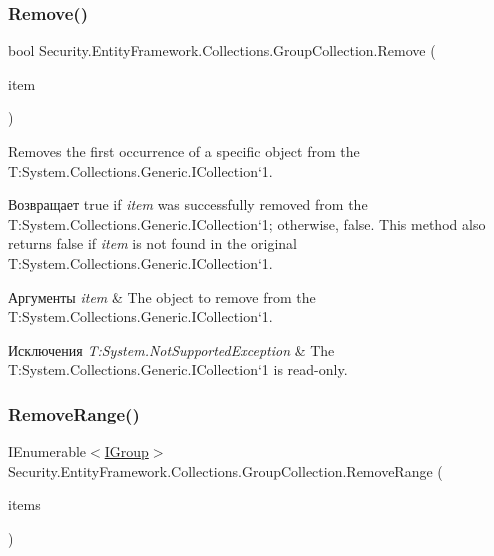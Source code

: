 \subsubsection{\texorpdfstring{Remove()}{Remove()}}
{\footnotesize\ttfamily bool Security.\+Entity\+Framework.\+Collections.\+Group\+Collection.\+Remove (\begin{DoxyParamCaption}\item[{\hyperlink{interface_security_1_1_interfaces_1_1_model_1_1_i_group}{I\+Group}}]{item }\end{DoxyParamCaption})}



Removes the first occurrence of a specific object from the T\+:\+System.\+Collections.\+Generic.\+I\+Collection`1. 

\begin{DoxyReturn}{Возвращает}
true if {\itshape item}  was successfully removed from the T\+:\+System.\+Collections.\+Generic.\+I\+Collection`1; otherwise, false. This method also returns false if {\itshape item}  is not found in the original T\+:\+System.\+Collections.\+Generic.\+I\+Collection`1. 
\end{DoxyReturn}

\begin{DoxyParams}{Аргументы}
{\em item} & The object to remove from the T\+:\+System.\+Collections.\+Generic.\+I\+Collection`1.\\
\hline
\end{DoxyParams}

\begin{DoxyExceptions}{Исключения}
{\em T\+:\+System.\+Not\+Supported\+Exception} & The T\+:\+System.\+Collections.\+Generic.\+I\+Collection`1 is read-\/only.\\
\hline
\end{DoxyExceptions}
\mbox{\label{class_security_1_1_entity_framework_1_1_collections_1_1_group_collection_ae3f247d3ea1086fc853707040f477840}} 
\subsubsection{\texorpdfstring{Remove\+Range()}{RemoveRange()}}
{\footnotesize\ttfamily I\+Enumerable$<$\hyperlink{interface_security_1_1_interfaces_1_1_model_1_1_i_group}{I\+Group}$>$ Security.\+Entity\+Framework.\+Collections.\+Group\+Collection.\+Remove\+Range (\begin{DoxyParamCaption}\item[{I\+Enumerable$<$ \hyperlink{interface_security_1_1_interfaces_1_1_model_1_1_i_group}{I\+Group} $>$}]{items }\end{DoxyParamCaption})}



